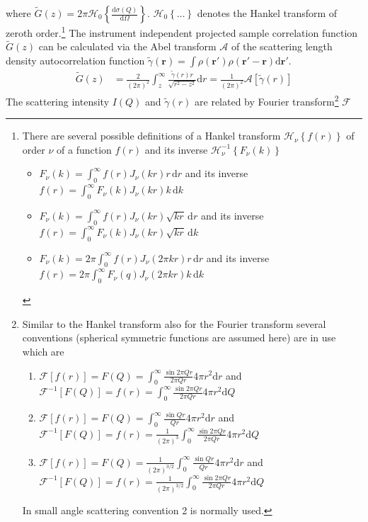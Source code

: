 where $\tilde{G}(z)=2\pi\mathcal{H}_0\left\{\frac{\mathrm{d}\sigma(Q)}{\mathrm{d}\Omega}\right\}$. $\mathcal{H}_0\left\{\ldots\right\}$ denotes the Hankel transform of zeroth order.\footnote{
There are several possible definitions of a Hankel transform $\mathcal{H}_\nu\left\{f(r)\right\}$ of order $\nu$ of a function $f(r)$ and its inverse $\mathcal{H}_\nu^{-1}\left\{F_\nu(k)\right\}$
\begin{itemize}
\item $F_\nu(k) = \int_0^\infty f(r) J_\nu(kr) r \,\mathrm{d}r$ and its inverse $f(r)=\int_0^\infty F_\nu(k)J_\nu(kr) k \,\mathrm{d}k$
\item $F_\nu(k) = \int_0^\infty f(r) J_\nu(kr) \sqrt{kr} \,\mathrm{d}r$ and its inverse $f(r)=\int_0^\infty F_\nu(k)J_\nu(kr)  \sqrt{kr}  \, \mathrm{d}k$
\item $F_\nu(k) = 2\pi \int_0^\infty f(r) J_\nu(2\pi kr) r \,\mathrm{d}r$ and its inverse $f(r)=2\pi \int_0^\infty F_\nu(q)J_\nu(2\pi kr) k \,\mathrm{d}k$
\end{itemize}
}
The instrument independent projected sample correlation function $\tilde{G}(z)$ can be calculated via the Abel transform $\mathcal{A}$ of the scattering length density autocorrelation function $\tilde{\gamma}(\mathbf{r})=\int \rho(\mathbf{r'})\rho(\mathbf{r'-r})\mathrm{d}\mathbf{r'}$.
\begin{align}
\tilde{G}(z) &= \frac{2}{(2\pi)^2} \int_z^\infty \frac{\tilde{\gamma}(r) r}{\sqrt{r^2-z^2}} \mathrm{d}r = \frac{1}{(2\pi)^2} \mathcal{A}\left[\tilde{\gamma}(r)\right]
\end{align}
The scattering intensity $I(Q)$ and  $\tilde{\gamma}(r)$ are related by Fourier transform\footnote{Similar to the Hankel transform also for the Fourier transform several conventions (spherical symmetric functions are assumed here) are in use which are
\begin{enumerate}
\item $\mathcal{F}[f(r)]=F(Q)=\int_0^\infty \frac{\sin 2\pi Qr}{2\pi Qr}4\pi r^2\mathrm{d}r$ and $\mathcal{F}^{-1}[F(Q)]=f(r)=\int_0^\infty \frac{\sin 2\pi Qr}{2\pi Qr}4\pi r^2\mathrm{d}Q$
\item $\mathcal{F}[f(r)]=F(Q)=\int_0^\infty \frac{\sin Qr}{ Qr}4\pi r^2\mathrm{d}r$ and $\mathcal{F}^{-1}[F(Q)]=f(r)=\frac{1}{(2\pi)^3}\int_0^\infty \frac{\sin 2\pi Qr}{2\pi Qr}4\pi r^2\mathrm{d}Q$
\item $\mathcal{F}[f(r)]=F(Q)=\frac{1}{(2\pi)^{3/2}}\int_0^\infty \frac{\sin Qr}{ Qr}4\pi r^2\mathrm{d}r$ and $\mathcal{F}^{-1}[F(Q)]=f(r)=\frac{1}{(2\pi)^{3/2}}\int_0^\infty \frac{\sin 2\pi Qr}{2\pi Qr}4\pi r^2\mathrm{d}Q$
\end{enumerate}
In small angle scattering convention 2 is normally used.
} $\mathcal{F}$
